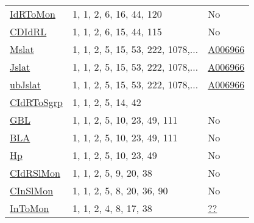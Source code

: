 {\begin{tabular}{|l|l|l|}
\hyperlink{IdRToMon}{IdRToMon}& 1, 1, 2, 6, 16, 44, 120 &No\\
\hyperlink{CDIdRL}{CDIdRL}& 1, 1, 2, 6, 15, 44, 115 &No\\
\hyperlink{Mslat}{Mslat}& 1, 1, 2, 5, 15, 53, 222, 1078,... &\href{http://oeis.org/A006966}{A006966}\\
\hyperlink{Jslat}{Jslat}& 1, 1, 2, 5, 15, 53, 222, 1078,... &\href{http://oeis.org/A006966}{A006966}\\
\hyperlink{ubJslat}{ubJslat}& 1, 1, 2, 5, 15, 53, 222, 1078,... &\href{http://oeis.org/A006966}{A006966}\\
\hyperlink{CIdRToSgrp}{CIdRToSgrp}& 1, 1, 2, 5, 14, 42 &\\
\hyperlink{GBL}{GBL}& 1, 1, 2, 5, 10, 23, 49, 111 &No\\
\hyperlink{BLA}{BLA}& 1, 1, 2, 5, 10, 23, 49, 111 &No\\
\hyperlink{Hp}{Hp}& 1, 1, 2, 5, 10, 23, 49 &No\\
\hyperlink{CIdRSlMon}{CIdRSlMon}& 1, 1, 2, 5, 9, 20, 38 &No\\
\hyperlink{CInSlMon}{CInSlMon}& 1, 1, 2, 5, 8, 20, 36, 90 &No\\
\hyperlink{InToMon}{InToMon}& 1, 1, 2, 4, 8, 17, 38 &\href{http://oeis.org/A229202}{??}\\
\end{tabular}

}
